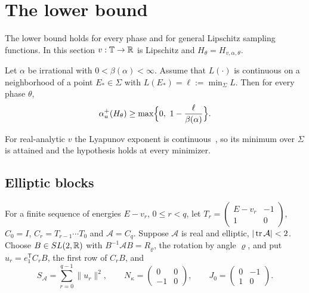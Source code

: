 \section{The lower bound}\label{sec:lower}

The lower bound holds for every phase and for general Lipschitz sampling functions. In this section $v:\mathbb T\to\mathbb R$ is Lipschitz and $H_\theta=H_{v,\alpha,\theta}$.

\begin{theorem}\label{thm:L}
Let $\alpha$ be irrational with $0<\beta(\alpha)<\infty$. Assume that $L(\cdot)$ is continuous on a neighborhood of a point $E_*\in\Sigma$ with $L(E_*)=\ell:=\min_\Sigma L$. Then for every phase $\theta$,
\[
\au(H_\theta)\ge\max\Bigl\{0,\ 1-\frac{\ell}{\beta(\alpha)}\Bigr\}.
\]
\end{theorem}

For real-analytic $v$ the Lyapunov exponent is continuous~\cite[Theorem~1]{BourgainJitomirskaya2002}, so its minimum over $\Sigma$ is attained and the hypothesis holds at every minimizer.

\subsection{Elliptic blocks}

For a finite sequence of energies $E-v_r$, $0\le r<q$, let $T_r=\begin{pmatrix}E-v_r&-1\\1&0\end{pmatrix}$, $C_0=I$, $C_r=T_{r-1}\cdots T_0$ and $\mathcal A=C_q$. Suppose $\mathcal A$ is real and elliptic, $|\operatorname{tr}\mathcal A|<2$. Choose $B\in SL(2,\mathbb R)$ with $B^{-1}\mathcal AB=R_\varrho$, the rotation by angle $\varrho$, and put $u_r=e_1^{\mathsf T}C_rB$, the first row of $C_rB$, and
\[
S_{\mathcal A}=\sum_{r=0}^{q-1}\|u_r\|^2,\qquad N_\kappa=\begin{pmatrix}0&0\\-1&0\end{pmatrix},\qquad J_0=\begin{pmatrix}0&-1\\1&0\end{pmatrix}.
\]

